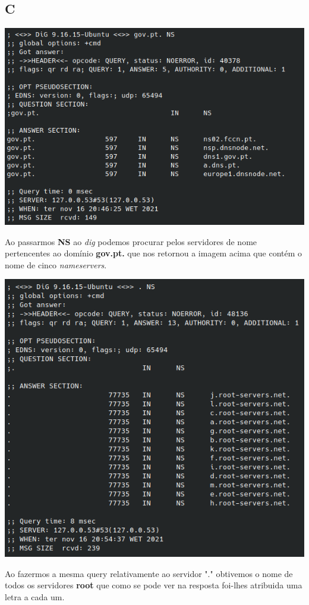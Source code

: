 \documentclass[size=11pt]{report}
\begin{document}
        \subsection*{C}
            \noindent
            \includegraphics[width=\textwidth]{images/dig_gov.pt.png}
            \par
                Ao passarmos \textbf{NS} ao \textit{dig} podemos procurar pelos servidores de nome pertencentes ao domínio \textbf{gov.pt.} que nos retornou a imagem acima que contém o nome de cinco \textit{nameservers}.\par
            \noindent
            \includegraphics[width=\textwidth]{images/dig_root.png}
            \par
                Ao fazermos a mesma query relativamente ao servidor "." obtivemos o nome de todos os servidores \textbf{root} que como se pode ver na resposta foi-lhes atribuida uma letra a cada um.
        \pagebreak
\end{document}
